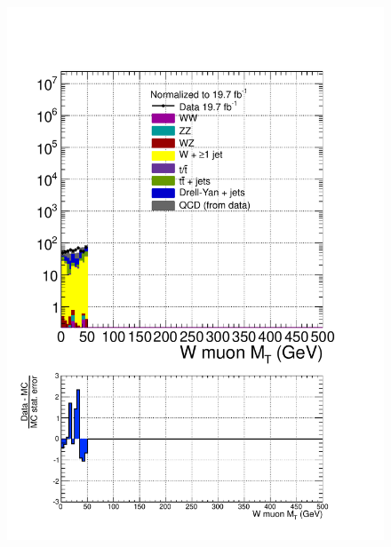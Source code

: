 \begin{figure}[hbtp]
  \begin{center}
    \includegraphics[width=\cmsFigWidth]{figures/dataVsMCQCD_WMuMT_lowMT_v87}

\end{center}
\end{figure}
